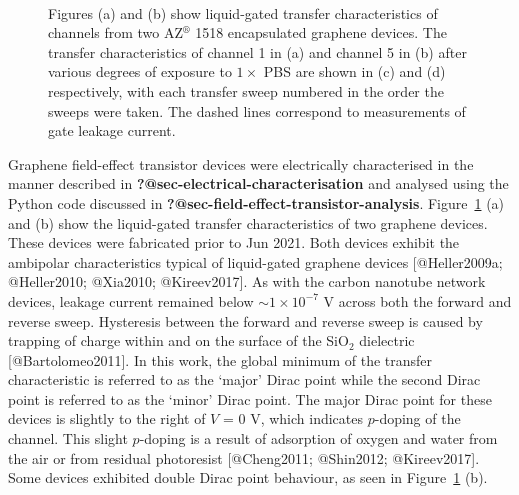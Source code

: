 \documentclass[
  letterpaper,
  DIV=11,
  numbers=noendperiod]{scrartcl}
\begin{document}
\begin{figure}
\begin{minipage}[t]{0.45\linewidth}
{{}

}

\end{minipage}%
%
\begin{minipage}[t]{0.01\linewidth}

{\centering 

~

}

\end{minipage}%

\caption{\label{fig-pristine-graphene}Figures (a) and (b) show
liquid-gated transfer characteristics of channels from two
AZ\(^\circledR\) 1518 encapsulated graphene devices. The transfer
characteristics of channel 1 in (a) and channel 5 in (b) after various
degrees of exposure to \(1 \times\) PBS are shown in (c) and (d)
respectively, with each transfer sweep numbered in the order the sweeps
were taken. The dashed lines correspond to measurements of gate leakage
current.}

\end{figure}

Graphene field-effect transistor devices were electrically characterised
in the manner described in \textbf{?@sec-electrical-characterisation}
and analysed using the Python code discussed in
\textbf{?@sec-field-effect-transistor-analysis}.
Figure~\ref{fig-pristine-graphene} (a) and (b) show the liquid-gated
transfer characteristics of two graphene devices. These devices were
fabricated prior to Jun 2021. Both devices exhibit the ambipolar
characteristics typical of liquid-gated graphene devices
{[}@Heller2009a; @Heller2010; @Xia2010; @Kireev2017{]}. As with the
carbon nanotube network devices, leakage current remained below
\(\sim 1 \times 10^{-7}\) V across both the forward and reverse sweep.
Hysteresis between the forward and reverse sweep is caused by trapping
of charge within and on the surface of the SiO\(_{2}\) dielectric
{[}@Bartolomeo2011{]}. In this work, the global minimum of the transfer
characteristic is referred to as the `major' Dirac point while the
second Dirac point is referred to as the `minor' Dirac point. The major
Dirac point for these devices is slightly to the right of \(V\) = 0 V,
which indicates \(p\)-doping of the channel. This slight \(p\)-doping is
a result of adsorption of oxygen and water from the air or from residual
photoresist {[}@Cheng2011; @Shin2012; @Kireev2017{]}. Some devices
exhibited double Dirac point behaviour, as seen in
Figure~\ref{fig-pristine-graphene} (b).
\end{document}
